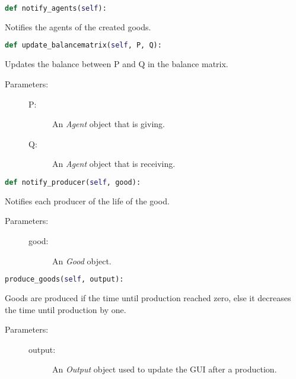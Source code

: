 \documentclass{article}
\begin{document}
\begin{lstlisting}[language=Python]
def notify_agents(self):
\end{lstlisting}
Notifies the agents of the created goods.

\begin{lstlisting}[language=Python]
def update_balancematrix(self, P, Q):
\end{lstlisting}
Updates the balance between P and Q in the balance matrix.

\begin{description}
  \item[Parameters:] \hfill
	\begin{description}
  		\item[P:] An \textit{Agent} object that is giving.
		\item[Q:] An \textit{Agent} object that is receiving.
	\end{description}

\end{description}

\begin{lstlisting}[language=Python]
def notify_producer(self, good):
\end{lstlisting}
Notifies each producer of the life of the good.

\begin{description}
  \item[Parameters:] \hfill
	\begin{description}
  		\item[good:] An \textit{Good} object.
	\end{description}

\end{description}

\begin{lstlisting}[language=Python]
produce_goods(self, output):
\end{lstlisting}
Goods are produced if the time until production reached zero, else it decreases the time until production by one.

\begin{description}
  \item[Parameters:] \hfill
	\begin{description}
  		\item[output:] An \textit{Output} object used to update the GUI after a production.
	\end{description}

\end{description}
\end{document}
